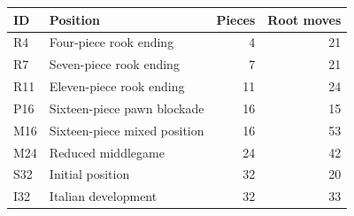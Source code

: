 \begin{center}\small
\begin{tabular}{llrr}
\toprule
ID & Position & Pieces & Root moves \\
\midrule
R4 & Four-piece rook ending & 4 & 21 \\
R7 & Seven-piece rook ending & 7 & 21 \\
R11 & Eleven-piece rook ending & 11 & 24 \\
P16 & Sixteen-piece pawn blockade & 16 & 15 \\
M16 & Sixteen-piece mixed position & 16 & 53 \\
M24 & Reduced middlegame & 24 & 42 \\
S32 & Initial position & 32 & 20 \\
I32 & Italian development & 32 & 33 \\
\bottomrule
\end{tabular}
\end{center}
